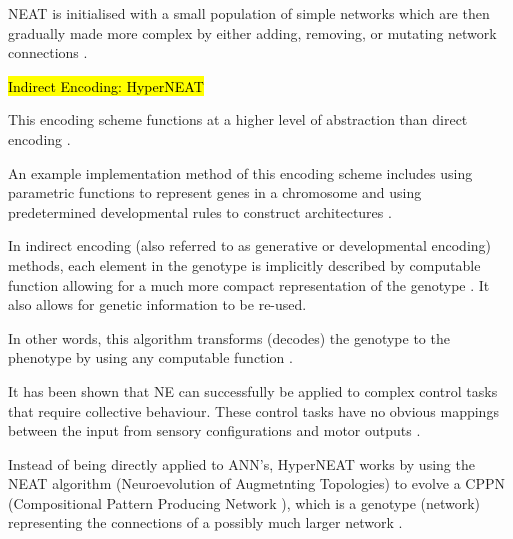 NEAT is initialised with a small population of simple networks which are then gradually made more complex by either adding, removing, or mutating network connections \cite{RefWorks:11,Gomez2003}.


\hl{Indirect Encoding: HyperNEAT}

This encoding scheme functions at a higher level of abstraction than direct encoding  \cite{Gomez2003}.

An example implementation method of this encoding scheme includes using parametric functions to represent genes in a chromosome and using predetermined developmental rules to construct architectures \cite{koutnik2010evolving}.

In indirect encoding (also referred to as generative or developmental encoding) methods, each element in the genotype is implicitly described by computable function allowing for a much more compact representation of the genotype \cite{clune2011performance,stanley2009hypercube}. It also allows for genetic information to be re-used.

In other words, this algorithm transforms (decodes) the genotype to the phenotype by using any computable function \cite{koutnik2010evolving}.


It has been shown that NE can successfully be applied to complex control tasks that require collective behaviour. These control tasks have no obvious mappings between the input from sensory configurations and motor outputs \cite{NitschkeSaEC2012}.


Instead of being directly applied to ANN's, HyperNEAT works by using the NEAT algorithm (Neuroevolution of Augmetnting Topologies) to evolve a CPPN (Compositional Pattern Producing Network \cite{StanleyMiikkulainen2002}), which is a genotype (network) representing the connections of a possibly much larger network \cite{RefWorks:14}.











